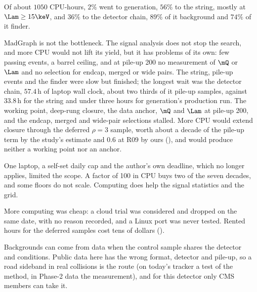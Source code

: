 \begin{chaptersummary}
  \item Of about $1050$ CPU-hours, $2\%$ went to generation, $56\%$ to the string, mostly at $\Lam\ge15\keV$, and $36\%$ to the detector chain, $89\%$ of it background and $74\%$ of it finder.
  \item MadGraph is not the bottleneck. The signal analysis does not stop the search, and more CPU would not lift its yield, but it has problems of its own: few passing events, a barrel ceiling, and at pile-up 200 no measurement of $\mQ$ or $\Lam$ and no selection for endcap, merged or wide pairs. The string, pile-up events and the finder were slow but finished; the longest wait was the detector chain, $57.4$\,h of laptop wall clock, about two thirds of it pile-up samples, against $33.8$\,h for the string and under three hours for generation's production run. The working point, deep-rung closure, the data anchor, $\mQ$ and $\Lam$ at pile-up 200, and the endcap, merged and wide-pair selections stalled. More CPU would extend closure through the deferred $\rho=3$ sample, worth about a decade of the pile-up term by the study's estimate and $0.6$ at R09 by ours (\EST), and would produce neither a working point nor an anchor.
  \item One laptop, a self-set daily cap and the author's own deadline, which no longer applies, limited the scope. A factor of 100 in CPU buys two of the seven decades, and some floors do not scale. Computing does help the signal statistics and the grid.
  \item More computing was cheap: a cloud trial was considered and dropped on the same date, with no reason recorded, and a Linux port was never tested. Rented hours for the deferred samples cost tens of dollars (\EST).
  \item Backgrounds can come from data when the control sample shares the detector and conditions. Public data here has the wrong format, detector and pile-up, so a road sideband in real collisions is the route (on today's tracker a test of the method, in Phase-2 data the measurement), and for this detector only CMS members can take it.
\end{chaptersummary}

